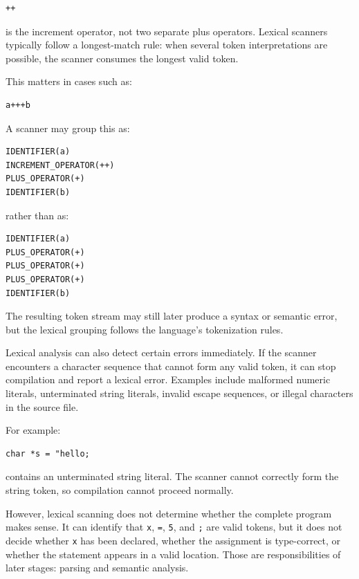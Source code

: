 \begin{verbatim}
++
\end{verbatim}

is the increment operator, not two separate plus operators. Lexical scanners typically follow a longest-match rule: when several token interpretations are possible, the scanner consumes the longest valid token.

This matters in cases such as:

\begin{verbatim}
a+++b
\end{verbatim}

A scanner may group this as:

\begin{verbatim}
IDENTIFIER(a)
INCREMENT_OPERATOR(++)
PLUS_OPERATOR(+)
IDENTIFIER(b)
\end{verbatim}

rather than as:

\begin{verbatim}
IDENTIFIER(a)
PLUS_OPERATOR(+)
PLUS_OPERATOR(+)
PLUS_OPERATOR(+)
IDENTIFIER(b)
\end{verbatim}

The resulting token stream may still later produce a syntax or semantic error, but the lexical grouping follows the language's tokenization rules.

Lexical analysis can also detect certain errors immediately. If the scanner encounters a character sequence that cannot form any valid token, it can stop compilation and report a lexical error. Examples include malformed numeric literals, unterminated string literals, invalid escape sequences, or illegal characters in the source file.

For example:

\begin{verbatim}
char *s = "hello;
\end{verbatim}

contains an unterminated string literal. The scanner cannot correctly form the string token, so compilation cannot proceed normally.

However, lexical scanning does not determine whether the complete program makes sense. It can identify that \texttt{x}, \texttt{=}, \texttt{5}, and \texttt{;} are valid tokens, but it does not decide whether \texttt{x} has been declared, whether the assignment is type-correct, or whether the statement appears in a valid location. Those are responsibilities of later stages: parsing and semantic analysis.

